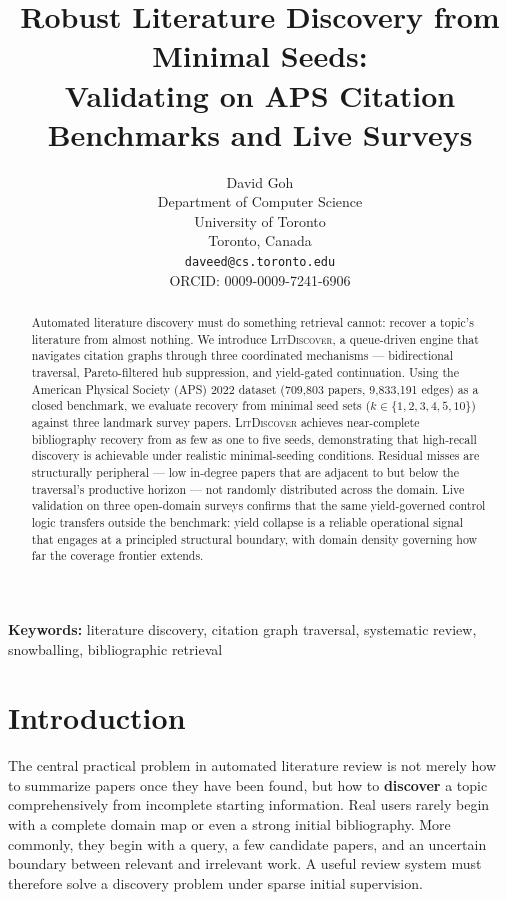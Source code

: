 \documentclass[12pt]{article}
\title{Robust Literature Discovery from Minimal Seeds:\\
  Validating \ldiscover{} on APS Citation Benchmarks and Live Surveys}
\author{David Goh \\
  Department of Computer Science \\
  University of Toronto \\
  Toronto, Canada \\
  \texttt{daveed@cs.toronto.edu} \\
  ORCID: 0009-0009-7241-6906}
\date{}
\newcommand{\ldiscover}{\textsc{LitDiscover}}
\begin{document}
\maketitle

\begin{abstract}
Automated literature discovery must do something retrieval cannot: recover a topic's
literature from almost nothing. We introduce \ldiscover{}, a queue-driven engine
that navigates citation graphs through three coordinated mechanisms --- bidirectional
traversal, Pareto-filtered hub suppression, and yield-gated continuation. Using the
American Physical Society (APS) 2022 dataset (709,803 papers, 9,833,191 edges) as a
closed benchmark, we evaluate recovery from minimal seed sets ($k \in \{1,2,3,4,5,10\}$)
against three landmark survey papers. \ldiscover{} achieves near-complete bibliography
recovery from as few as one to five seeds, demonstrating that high-recall discovery is
achievable under realistic minimal-seeding conditions. Residual misses are structurally
peripheral --- low in-degree papers that are adjacent to but below the traversal's
productive horizon --- not randomly distributed across the domain. Live validation on three
open-domain surveys confirms that the same yield-governed control logic transfers outside
the benchmark: yield collapse is a reliable operational signal that engages at a principled
structural boundary, with domain density governing how far the coverage frontier extends.
\end{abstract}

\noindent\textbf{Keywords:} literature discovery, citation graph traversal, systematic review, snowballing, bibliographic retrieval

\section{Introduction}

The central practical problem in automated literature review is not merely how to summarize
papers once they have been found, but how to \textbf{discover} a topic comprehensively from
incomplete starting information. Real users rarely begin with a complete domain map or even
a strong initial bibliography. More commonly, they begin with a query, a few candidate
papers, and an uncertain boundary between relevant and irrelevant work. A useful review
system must therefore solve a discovery problem under sparse initial supervision.
\end{document}
